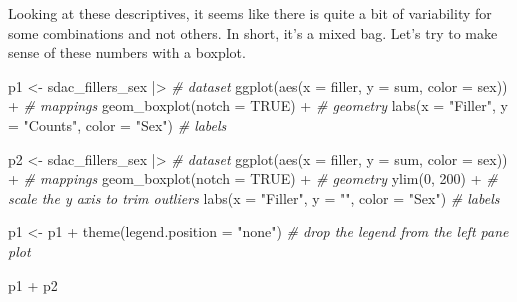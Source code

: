 \documentclass[
  letterpaper,
]{scrbook}
\newenvironment{Shaded}{\begin{snugshade}}{\end{snugshade}}
\newcommand{\AttributeTok}[1]{\textcolor[rgb]{0.00,0.00,0.00}{#1}}
\newcommand{\CommentTok}[1]{\textcolor[rgb]{0.00,0.00,0.00}{\textit{#1}}}
\newcommand{\ConstantTok}[1]{\textcolor[rgb]{0.00,0.00,0.00}{#1}}
\newcommand{\DecValTok}[1]{\textcolor[rgb]{0.00,0.00,0.00}{#1}}
\newcommand{\FunctionTok}[1]{\textcolor[rgb]{0.00,0.00,0.00}{#1}}
\newcommand{\NormalTok}[1]{\textcolor[rgb]{0.00,0.00,0.00}{#1}}
\newcommand{\OtherTok}[1]{\textcolor[rgb]{0.00,0.00,0.00}{#1}}
\newcommand{\SpecialCharTok}[1]{\textcolor[rgb]{0.00,0.00,0.00}{#1}}
\newcommand{\StringTok}[1]{\textcolor[rgb]{0.00,0.00,0.00}{#1}}
\begin{document}
Looking at these descriptives, it seems like there is quite a bit of
variability for some combinations and not others. In short, it's a mixed
bag. Let's try to make sense of these numbers with a boxplot.

\begin{Shaded}
\begin{Highlighting}[]
\NormalTok{p1 }\OtherTok{\textless{}{-}} 
\NormalTok{  sdac\_fillers\_sex }\SpecialCharTok{|\textgreater{}} \CommentTok{\# dataset}
  \FunctionTok{ggplot}\NormalTok{(}\FunctionTok{aes}\NormalTok{(}\AttributeTok{x =}\NormalTok{ filler, }\AttributeTok{y =}\NormalTok{ sum, }\AttributeTok{color =}\NormalTok{ sex)) }\SpecialCharTok{+} \CommentTok{\# mappings}
  \FunctionTok{geom\_boxplot}\NormalTok{(}\AttributeTok{notch =} \ConstantTok{TRUE}\NormalTok{) }\SpecialCharTok{+} \CommentTok{\# geometry}
  \FunctionTok{labs}\NormalTok{(}\AttributeTok{x =} \StringTok{"Filler"}\NormalTok{, }\AttributeTok{y =} \StringTok{"Counts"}\NormalTok{, }\AttributeTok{color =} \StringTok{"Sex"}\NormalTok{) }\CommentTok{\# labels}

\NormalTok{p2 }\OtherTok{\textless{}{-}} 
\NormalTok{  sdac\_fillers\_sex }\SpecialCharTok{|\textgreater{}} \CommentTok{\# dataset}
  \FunctionTok{ggplot}\NormalTok{(}\FunctionTok{aes}\NormalTok{(}\AttributeTok{x =}\NormalTok{ filler, }\AttributeTok{y =}\NormalTok{ sum, }\AttributeTok{color =}\NormalTok{ sex)) }\SpecialCharTok{+} \CommentTok{\# mappings}
  \FunctionTok{geom\_boxplot}\NormalTok{(}\AttributeTok{notch =} \ConstantTok{TRUE}\NormalTok{) }\SpecialCharTok{+} \CommentTok{\# geometry}
  \FunctionTok{ylim}\NormalTok{(}\DecValTok{0}\NormalTok{, }\DecValTok{200}\NormalTok{) }\SpecialCharTok{+} \CommentTok{\# scale the y axis to trim outliers}
  \FunctionTok{labs}\NormalTok{(}\AttributeTok{x =} \StringTok{"Filler"}\NormalTok{, }\AttributeTok{y =} \StringTok{""}\NormalTok{, }\AttributeTok{color =} \StringTok{"Sex"}\NormalTok{) }\CommentTok{\# labels}

\NormalTok{p1 }\OtherTok{\textless{}{-}}\NormalTok{ p1 }\SpecialCharTok{+} \FunctionTok{theme}\NormalTok{(}\AttributeTok{legend.position =} \StringTok{"none"}\NormalTok{) }\CommentTok{\# drop the legend from the left pane plot}

\NormalTok{p1 }\SpecialCharTok{+}\NormalTok{ p2}
\end{Highlighting}
\end{Shaded}
\end{document}
